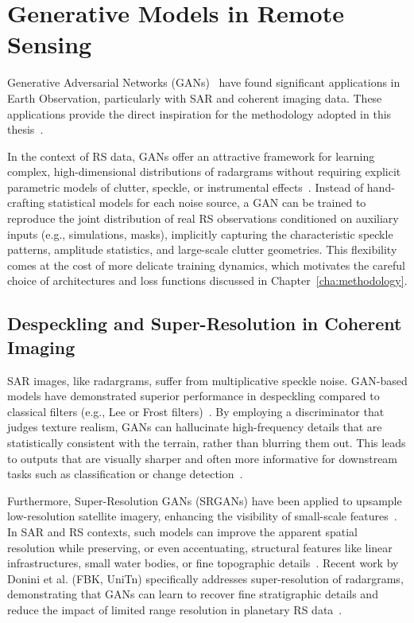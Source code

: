 \section{Generative Models in Remote Sensing}
\label{sec:generative_rs}
Generative Adversarial Networks (GANs)~\cite{Goodfellow_2014} have found significant applications in Earth Observation, particularly with SAR and coherent imaging data.
These applications provide the direct inspiration for the methodology adopted in this thesis~\cite{Li2022SRGANRemoteSensing,yebasse2025advances}.

In the context of RS data, GANs offer an attractive framework for learning complex, high-dimensional distributions of radargrams without requiring explicit parametric models of clutter, speckle, or instrumental effects~\cite{yebasse2025advances}.
Instead of hand-crafting statistical models for each noise source, a GAN can be trained to reproduce the joint distribution of real RS observations conditioned on auxiliary inputs (e.g., simulations, masks), implicitly capturing the characteristic speckle patterns, amplitude statistics, and large-scale clutter geometries.
This flexibility comes at the cost of more delicate training dynamics, which motivates the careful choice of architectures and loss functions discussed in Chapter~\ref{cha:methodology}.

\subsection{Despeckling and Super-Resolution in Coherent Imaging}
SAR images, like radargrams, suffer from multiplicative speckle noise.
GAN-based models have demonstrated superior performance in despeckling compared to classical filters (e.g., Lee or Frost filters)~\cite{Ma2020SARGAN,Gu2019GANDespeckling}.
By employing a discriminator that judges texture realism, GANs can hallucinate high-frequency details that are statistically consistent with the terrain, rather than blurring them out.
This leads to outputs that are visually sharper and often more informative for downstream tasks such as classification or change detection~\cite{Li2022SRGANRemoteSensing}.

Furthermore, Super-Resolution GANs (SRGANs) have been applied to upsample low-resolution satellite imagery, enhancing the visibility of small-scale features~\cite{Ledig2017SRGAN,Li2022SRGANRemoteSensing}.
In SAR and RS contexts, such models can improve the apparent spatial resolution while preserving, or even accentuating, structural features like linear infrastructures, small water bodies, or fine topographic details~\cite{Donini2024SuperResRS}.
Recent work by Donini et al. (FBK, UniTn) specifically addresses super-resolution of radargrams, demonstrating that GANs can learn to recover fine stratigraphic details and reduce the impact of limited range resolution in planetary RS data~\cite{Donini2024SuperResRS}.


